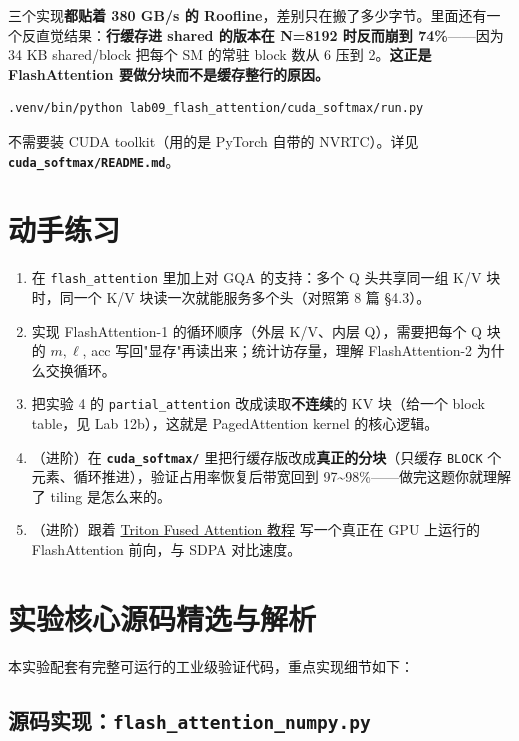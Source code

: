 三个实现\textbf{都贴着 380 GB/s 的 Roofline}，差别只在搬了多少字节。里面还有一个反直觉结果：\textbf{行缓存进 shared 的版本在 N=8192 时反而崩到 74\%}——因为 34 KB shared/block 把每个 SM 的常驻 block 数从 6 压到 2。\textbf{这正是 FlashAttention 要做分块而不是缓存整行的原因。}

\begin{lstlisting}[language=bash]
.venv/bin/python lab09_flash_attention/cuda_softmax/run.py
\end{lstlisting}

不需要装 CUDA toolkit（用的是 PyTorch 自带的 NVRTC）。详见 \textbf{\texttt{cuda\_softmax/README.md}}。

\section{动手练习}

\begin{enumerate}
  \item 在 \texttt{flash\_attention} 里加上对 GQA 的支持：多个 Q 头共享同一组 K/V 块时，同一个 K/V 块读一次就能服务多个头（对照第 8 篇 §4.3）。
  \item 实现 FlashAttention-1 的循环顺序（外层 K/V、内层 Q），需要把每个 Q 块的 $m, \ell$, acc 写回"显存"再读出来；统计访存量，理解 FlashAttention-2 为什么交换循环。
  \item 把实验 4 的 \texttt{partial\_attention} 改成读取\textbf{不连续}的 KV 块（给一个 block table，见 Lab 12b），这就是 PagedAttention kernel 的核心逻辑。
  \item （进阶）在 \textbf{\texttt{cuda\_softmax/}} 里把行缓存版改成\textbf{真正的分块}（只缓存 \texttt{BLOCK} 个元素、循环推进），验证占用率恢复后带宽回到 97\textasciitilde{}98\%——做完这题你就理解了 tiling 是怎么来的。
  \item （进阶）跟着 \href{https://triton-lang.org/main/getting-started/tutorials/06-fused-attention.html}{Triton Fused Attention 教程} 写一个真正在 GPU 上运行的 FlashAttention 前向，与 SDPA 对比速度。
\end{enumerate}



\section{实验核心源码精选与解析}

本实验配套有完整可运行的工业级验证代码，重点实现细节如下：


\subsection{源码实现：\texttt{flash\_attention\_numpy.py}}



